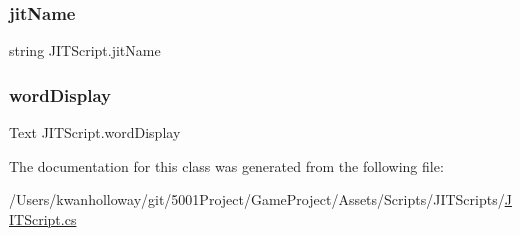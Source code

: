 \mbox{\label{class_j_i_t_script_a47cba90f798093a7568d746789846520}} 
\subsubsection{\texorpdfstring{jit\+Name}{jitName}}
{\footnotesize\ttfamily string J\+I\+T\+Script.\+jit\+Name}

\mbox{\label{class_j_i_t_script_a033821b78a287d85204d336682fc6ee2}} 
\subsubsection{\texorpdfstring{word\+Display}{wordDisplay}}
{\footnotesize\ttfamily Text J\+I\+T\+Script.\+word\+Display}



The documentation for this class was generated from the following file\+:\begin{DoxyCompactItemize}
\item 
/\+Users/kwanholloway/git/5001\+Project/\+Game\+Project/\+Assets/\+Scripts/\+J\+I\+T\+Scripts/\hyperlink{_j_i_t_script_8cs}{J\+I\+T\+Script.\+cs}\end{DoxyCompactItemize}
